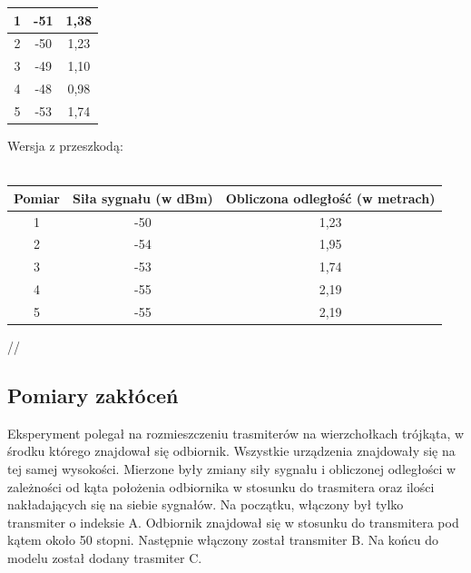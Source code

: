 \begin{itemize}
\begin{center}
\begin{minipage}{\linewidth}
\begin{tabular}{|c|c|c|}
				\hline 
				1 & -51 & 1,38 \\ 
				\hline 
				2 & -50 & 1,23 \\ 
				\hline 
				3 & -49 & 1,10 \\ 
				\hline 
				4 & -48 & 0,98 \\ 
				\hline 
				5 & -53 & 1,74 \\ 
				\hline 
			\end{tabular} 
		\end{minipage} 
	\end{center}
	\begin{center}
		\begin{minipage}{\linewidth}
			Wersja z przeszkodą:\\\\
			\begin{tabular}{|c|c|c|}
				\hline 
				Pomiar & Siła sygnału (w dBm) & Obliczona odległość (w metrach) \\ 
				\hline 
				1 & -50 & 1,23 \\ 
				\hline 
				2 & -54 & 1,95 \\ 
				\hline 
				3 & -53 & 1,74 \\ 
				\hline 
				4 & -55 & 2,19 \\ 
				\hline 
				5 & -55 & 2,19 \\ 
				\hline 
			\end{tabular}//
		\end{minipage} 
	\end{center}
\end{itemize}

\subsection{Pomiary zakłóceń}
Eksperyment polegał na rozmieszczeniu trasmiterów na wierzchołkach trójkąta, w środku którego znajdował się odbiornik. Wszystkie urządzenia znajdowały się na tej samej wysokości. Mierzone były zmiany siły sygnału i obliczonej odległości w zależności od kąta położenia odbiornika w stosunku do trasmitera oraz ilości nakładających się na siebie sygnałów. Na początku, włączony był tylko transmiter o indeksie A. Odbiornik znajdował się w stosunku do transmitera pod kątem około 50 stopni. Następnie włączony został transmiter B. Na końcu do modelu został dodany trasmiter C.\\

